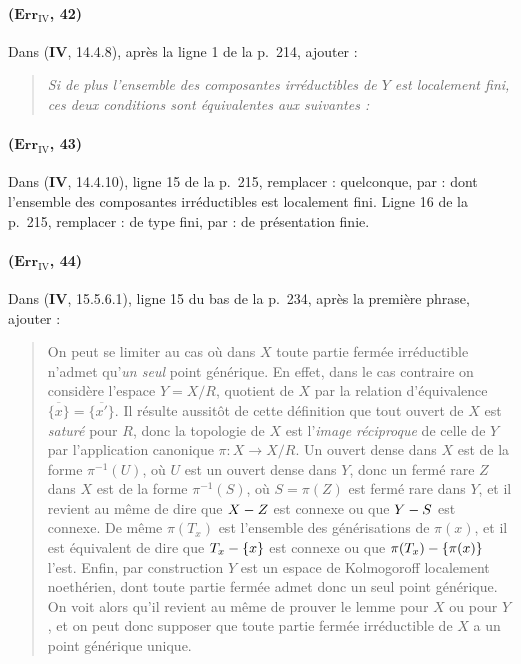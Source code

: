 \paragraph{($\mathbf{Err}_{\mathrm{IV}}$, 42)}
Dans (\textbf{IV}, 14.4.8), après la ligne 1 de la p.~214, ajouter :
\begin{quote}
\emph{Si de plus l'ensemble des composantes irréductibles de $Y$ est
localement fini, ces deux conditions sont équivalentes aux suivantes :}
\end{quote}

\paragraph{($\mathbf{Err}_{\mathrm{IV}}$, 43)}
Dans (\textbf{IV}, 14.4.10), ligne 15 de la p.~215, remplacer : quelconque, par :
dont l'ensemble des composantes irréductibles est localement fini.
Ligne 16 de la p.~215, remplacer : de type fini, par : de présentation
finie.

\paragraph{($\mathbf{Err}_{\mathrm{IV}}$, 44)}
Dans (\textbf{IV}, 15.5.6.1), ligne 15 du bas de la p.~234, après la première
phrase, ajouter :

\begin{quote}
On peut se limiter au cas où dans $X$ toute partie fermée irréductible
n'admet qu'\emph{un seul} point générique. En effet, dans le cas contraire on
considère l'espace $Y=X/R$,
quotient de $X$ par la relation d'équivalence
$\overline{\{x\}}=\overline{\{x'\}}$. Il résulte aussitôt de cette
définition que tout ouvert de $X$ est \emph{saturé} pour $R$, donc la topologie
de $X$ est l'\emph{image réciproque} de celle de $Y$ par l'application
canonique $\pi:X\to X/R$. Un ouvert dense dans $X$ est de la forme
$\pi^{-1}(U)$, où $U$ est un ouvert dense dans $Y$, donc un fermé rare
$Z$ dans $X$ est de la forme $\pi^{-1}(S)$, où $S=\pi(Z)$ est fermé
rare dans $Y$, et il revient au même de dire que $X- Z$ est connexe ou
que $Y- S$ est connexe. De même $\pi(T_x)$ est l'ensemble des
générisations de $\pi(x)$, et il est équivalent de dire que
$T_x-\{x\}$ est connexe ou que $\pi(T_x)-\{\pi(x)\}$ l'est. Enfin, par
construction $Y$ est un espace de Kolmogoroff localement noethérien,
dont toute partie fermée admet donc un seul point générique. On voit
alors qu'il revient au même de prouver le lemme pour $X$ ou pour $Y$,
et on peut donc supposer que toute partie fermée irréductible de $X$ a
un point générique unique.
\end{quote}

